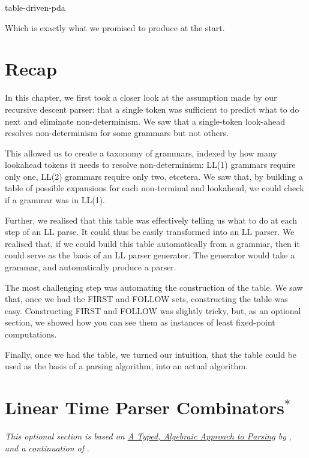 \begin{center}
    {table-driven-pda}
\end{center}

Which is exactly what we promised to produce at the start.

\section{Recap}
In this chapter, we first took a closer look at the assumption made by our recursive descent parser: that a single token was sufficient to predict what to do next and eliminate non-determinism. We saw that a single-token look-ahead resolves non-determinism for some grammars but not others.

This allowed us to create a taxonomy of grammars, indexed by how many lookahead tokens it needs to resolve non-determinism: LL(1) grammars require only one, LL(2) grammars require only two, etcetera. We saw that, by building a table of possible expansions for each non-terminal and lookahead, we could check if a grammar was in LL(1). 

Further, we realised that this table was effectively telling us what to do at each step of an LL parse. It could thus be easily transformed into an LL parser. We realised that, if we could build this table automatically from a grammar, then it could serve as the basis of an LL parser generator. The generator would take a grammar, and automatically produce a parser.

The most challenging step was automating the construction of the table. We saw that, once we had the \textsf{FIRST} and \textsf{FOLLOW} sets, constructing the table was easy. Constructing \textsf{FIRST} and \textsf{FOLLOW} was slightly tricky, but, as an optional section, we showed how you can see them as instances of least fixed-point computations. 

Finally, once we had the table, we turned our intuition, that the table could be used as the basis of a parsing algorithm, into an actual algorithm.



\section{Linear Time Parser Combinators$^*$}\label{section:linear-parser-combinators}
\textit{This optional section is based on \href{https://www.cl.cam.ac.uk/~jdy22/papers/a-typed-algebraic-approach-to-parsing.pdf}{A Typed, Algebraic Approach to Parsing} by} \citet{krishnaswami-2019}, \textit{and a continuation of} .

